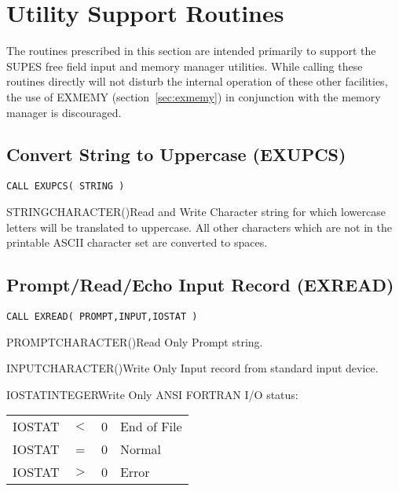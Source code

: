 \section{Utility Support Routines}
The routines prescribed in this section are intended primarily to support
the SUPES free field input and memory manager utilities.  While calling
these routines directly will not disturb the internal operation of these
other facilities, the use of EXMEMY (section~\ref{sec:exmemy}) in
conjunction with the memory manager is discouraged. 

\subsection{Convert String to Uppercase (EXUPCS)} \label{sec:exupcs}

\verb+CALL EXUPCS( STRING )+

\begin{argy}{STRING}{CHARACTER\last(\last)}{Read and Write}
Character string for which lowercase letters will be translated to
uppercase.  All other characters which are not in the printable ASCII character
set are converted to spaces. 
\end{argy}

\subsection{Prompt/Read/Echo Input Record (EXREAD)} \label{sec:exread}

\verb+CALL EXREAD( PROMPT,INPUT,IOSTAT )+

\begin{argy}{PROMPT}{CHARACTER\last(\last)}{Read Only}
Prompt string.
\end{argy}

\begin{argy}{INPUT}{CHARACTER\last(\last)}{Write Only}
Input record from standard input device.
\end{argy}

\begin{argy}{IOSTAT}{INTEGER}{Write Only}
ANSI FORTRAN I/O status:\\
\begin{tabular}{cccl}
IOSTAT &$<$ & 0 & End of File\\
IOSTAT &=   & 0 & Normal\\
IOSTAT &$>$ & 0 & Error\\
\end{tabular}
\end{argy}

